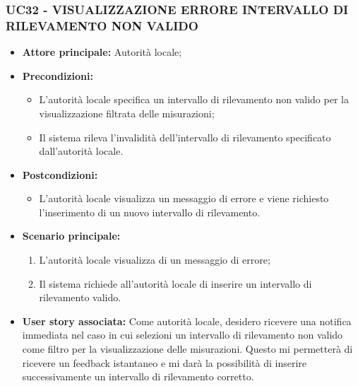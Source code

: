\subsubsection{UC32 - VISUALIZZAZIONE ERRORE INTERVALLO DI RILEVAMENTO NON VALIDO}
\begin{itemize}
    \item \textbf{Attore principale:} Autorità locale;
    \item \textbf{Precondizioni:}
        \begin{itemize} 
            \item L'autorità locale specifica un intervallo di rilevamento non valido per la visualizzazione filtrata delle misurazioni;
            \item Il sistema rileva l'invalidità dell'intervallo di rilevamento specificato dall'autorità locale.
        \end{itemize}
    \item \textbf{Postcondizioni:}
        \begin{itemize}
            \item L'autorità locale visualizza un messaggio di errore e viene richiesto l'inserimento di un nuovo intervallo di rilevamento.
        \end{itemize}
    \item \textbf{Scenario principale:}
            \begin{enumerate}
            \item L'autorità locale visualizza di un messaggio di errore;
            \item Il sistema richiede all'autorità locale di inserire un intervallo di rilevamento valido.
            \end{enumerate}
    \item \textbf{User story associata:}
        Come autorità locale, desidero ricevere una notifica immediata nel caso in cui selezioni un intervallo di rilevamento non valido come filtro per la visualizzazione delle misurazioni. Questo mi permetterà di ricevere un feedback istantaneo e mi darà la possibilità di inserire successivamente un intervallo di rilevamento corretto.
\end{itemize}